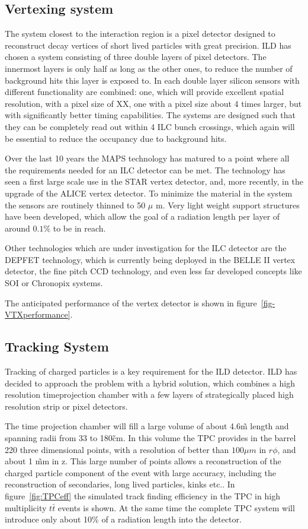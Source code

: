 \documentclass[%
 amsmath,amssymb,
 aps,
]{revtex4-1}
\begin{document}
 
\subsection{Vertexing system}
The system closest to the interaction region is a pixel detector designed to reconstruct decay vertices of short lived particles with great precision. ILD has chosen a system consisting of three double layers of pixel detectors. The innermost layers is only half as long as the other ones, to reduce the number of background hits this layer is exposed to. In each double layer silicon sensors with different functionality are combined: one, which will provide excellent spatial resolution, with a pixel size of XX, one with a pixel size about 4 times larger, but with significantly better timing capabilities. The systems are designed such that they can be completely read out within 4 ILC bunch crossings, which again will be essential to reduce the occupancy due to background hits. 

Over the last 10 years the MAPS technology has matured to a point where all the requirements needed for an ILC detector can be met. The technology has seen a first large scale use in the STAR vertex detector, and, more recently, in the upgrade of the ALICE vertex detector. To minimize the material in the system the sensors are routinely thinned to 50 $\mu$ m. Very light weight support structures have been developed, which allow the goal of a radiation length per layer of around $0.1 \%$ to be in reach. 

Other technologies which are under investigation for the ILC detector are the DEPFET technology, which is currently being deployed in the BELLE II vertex detector, the fine pitch CCD technology, and even less far developed concepts like SOI or Chronopix systems. 

The anticipated performance of the vertex detector is shown in figure~\ref{fig-VTXperformance}.  

\subsection{Tracking System}

Tracking of charged particles is a key requirement for the ILD detector. ILD has decided to approach the problem with a hybrid solution, which combines a high resolution timeprojection chamber with a few layers of strategically placed high resolution strip or pixel detectors. 

The time projection chamber will fill a large volume of about 4.6\~m length and spanning radii from 33 to 180\~cm. In this volume the TPC provides in the barrel 220 three dimensional points, with a resolution of better than $100 \mu m$ in $r \phi$, and about 1 \~mm in z. This large number of points allows a reconstruction of the charged particle component of the event with large accuracy, including the reconstruction of secondaries, long lived particles, kinks etc.. In figure~\ref{fig:TPCeff} the simulated track finding efficiency in the TPC in high multiplicity $t \bar t$ events is shown. At the same time the complete TPC system will introduce only about 10\% of a radiation length into the detector. 
\end{document}

